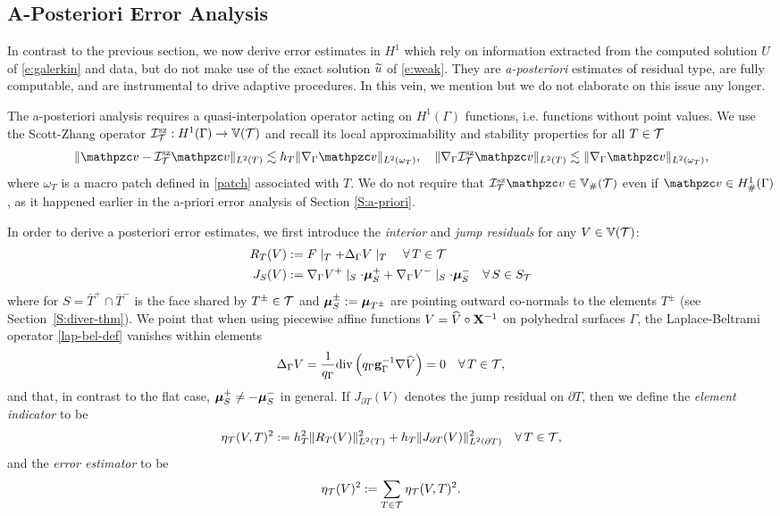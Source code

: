 \subsection{A-Posteriori Error Analysis}\label{S:a-posteriori}

In contrast to the previous section, we now derive error estimates in $H^1$
which rely on information extracted from the computed solution $U$ of \eqref{e:galerkin}
and data, but do not make use of the exact solution $\widetilde{u}$ of \eqref{e:weak}. They are
{\it a-posteriori} estimates of residual type, are fully computable, and are
instrumental to drive adaptive procedures. In this vein, we mention
\cite{BCMMN16,BCMN:Magenes} but we do not elaborate on this issue any longer.

The a-posteriori analysis requires a quasi-interpolation operator acting on
$H^1(\Gamma)$ functions, i.e. functions without point values. 
We use the Scott-Zhang operator $\mathcal{I}_{\mathcal{T}}^{\textrm{sz}}:H^1(\Gamma) \rightarrow \mathbb{V}(\mathcal{T})$ and recall its local approximability and stability properties for all $T\in\mathcal{T}$
%
\begin{equation}\label{e:sz_interp}
\| \tv- \interp^{\textrm{sz}} \tv \|_{L^2(T)} \lesssim  h_T \| \nabla_\Gamma \tv \|_{L^2(\omega_T)}, \quad \| \nabla_\Gamma \interp^{\textrm{sz}} \tv\|_{L^2(T)} \lesssim  \| \nabla_\Gamma \tv \|_{L^2(\omega_T)} ,
\end{equation}
where $\omega_T$ is a macro patch defined in \eqref{patch} associated with $T$.
We do not require that $\interp^\textrm{sz} \tv\in\V_\#(\T)$ even if
$\tv\in H^1_\#(\Gamma)$, as it happened earlier in the a-priori error analysis
of Section \ref{S:a-priori}.

In order to derive a posteriori error estimates, we first introduce the
{\it interior} and {\it jump residuals} for any $V\in \mathbb{V}(\mathcal{T})$:
\begin{align*}
R_T(V) &:= F\mid_T +\Delta_\Gamma V  \mid_T\quad\forall \, T\in {\ensuremath{\mathcal{T}}}\\
J_S(V) &:= \nabla_\Gamma V^+\mid_S \cdot {\boldsymbol \mu}^+_S +\nabla_\Gamma V^-\mid_S \cdot {\boldsymbol \mu}^-_S \quad \forall \, S\in S_{\mathcal{T}}
\end{align*}
where for $S=\overline{T}^+\cap \overline{T}^-$ is the face shared by $T^\pm\in\mathcal{T}$
and ${\boldsymbol \mu}^\pm_S:= {\boldsymbol \mu}_{T^\pm}$  are pointing outward co-normals to the elements $T^\pm$
(see Section~\ref{S:diver-thm}).
%
We point that when using piecewise affine functions $V=\widehat{V}\circ{\bf X}^{-1}$
on polyhedral surfaces
$\Gamma$, the Laplace-Beltrami operator \eqref{lap-bel-def} vanishes within elements 
$$
\Delta_\Gamma V = \frac 1 {q_\Gamma}  \mathrm{div}\left( q_{\Gamma}{\bf g}_{\Gamma}^{-1}\nabla \widehat V \right) = 0
\quad\forall \, T\in\mathcal{T},
$$
and that, in contrast to the flat case, ${\boldsymbol \mu}^+_S\ne -{\boldsymbol \mu}^-_S$ in general.
If $J_{\partial T}(V)$ denotes the jump residual on $\partial T$, then
we define the {\it element indicator} to be
%
\[
\eta_{\mathcal{T}}(V,T)^2 := h_T^2 \| R_T(V)\|_{L^2(T)}^2
+  h_T \| J_{\partial{T}}(V) \|^2_{L^2(\partial{T})}
\quad\forall \, T\in\mathcal{T},
\]
%
and the {\it error estimator} to be
%
\[
\eta_{\mathcal{T}}(V)^2 := \sum_{T\in \mathcal{T}}\eta_{\mathcal{T}}(V,T)^2.
\]

